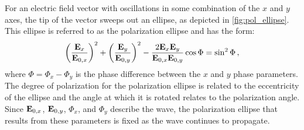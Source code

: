 For an electric field vector with oscillations in some combination of the $x$ and $y$ axes, the tip of the vector sweeps out an ellipse, as depicted in \autoref{fig:pol_ellipse}.
This ellipse is referred to as the polarization ellipse and has the form:
\begin{equation} \label{eq:pol_ellipse}
    \left( \frac{\mathbf{E}_{x}}{\mathbf{E}_{0, x}}\right)^{2} +
    \left( \frac{\mathbf{E}_{y}}{\mathbf{E}_{0, y}}\right)^{2} -
    \frac{2 \mathbf{E}_{x} \mathbf{E}_{y}}{\mathbf{E}_{0, x} \mathbf{E}_{0, y}} \cos\Phi =
    \sin^{2} \Phi\,,
\end{equation}
where $\Phi = \Phi_{x} - \Phi_{y}$ is the phase difference between the $x$ and $y$ phase parameters.
The degree of polarization for the polarization ellipse is related to the eccentricity of the ellipse and the angle at which it is rotated relates to the polarization angle.
Since $\mathbf{E}_{0, x}$, $\mathbf{E}_{0, y}$, $\Phi_{x}$, and $\Phi_{y}$ describe the wave, the polarization ellipse that results from these parameters is fixed as the wave continues to propagate.

\enlargethispage{-4\baselineskip}

